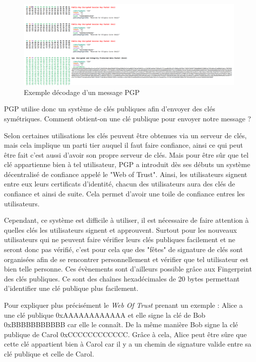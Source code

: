 \begin{figure}[h!]
	\includegraphics[width=\textwidth]{images/examplePGPDecode.png}
	\centering
	\caption{Exemple décodage d'un message PGP}
	\label{fig:PGP_DECODE}
\end{figure}

PGP utilise donc un système de clés publiques afin d'envoyer des clés symétriques. Comment obtient-on une clé publique pour envoyer notre message ?

Selon certaines utilisations les clés peuvent être obtenues via un serveur de clés, mais cela implique un parti tier auquel il faut faire confiance, ainsi ce qui peut être fait c'est aussi d'avoir son propre serveur de clés. Mais pour être sûr que tel clé appartienne bien à tel utilisateur, PGP a introduit dès ses débuts un système décentralisé de confiance appelé le "Web of Trust". Ainsi, les utilisateurs signent entre eux leurs certificats d'identité, chacun des utilisateurs aura des clés de confiance et ainsi de suite. Cela permet d'avoir une toile de confiance entres les utilisateurs.

Cependant, ce système est difficile à utiliser, il est nécessaire de faire attention à quelles clés les utilisateurs signent et approuvent. Surtout pour les nouveaux utilisateurs qui ne peuvent faire vérifier leurs clés publiques facilement et ne seront donc pas vérifié, c'est pour cela que des "fêtes" de signature de clés sont organisées afin de se rencontrer personnellement et vérifier que tel utilisateur est bien telle personne. Ces évènements sont d'ailleurs possible grâce aux Fingerprint des clés publiques. Ce sont des chaînes hexadécimales de 20 bytes permettant d'identifier une clé publique plus facilement.

Pour expliquer plus précisément le \textit{Web Of Trust} prenant un exemple : Alice a une clé publique 0xAAAAAAAAAAAA et elle signe la clé de Bob 0xBBBBBBBBBBB car elle le connaît. De la même manière Bob signe la clé publique de Carol 0xCCCCCCCCCCCC. Grâce à cela, Alice peut être sûre que cette clé appartient bien à Carol car il y a un chemin de signature valide entre sa clé publique et celle de Carol.

